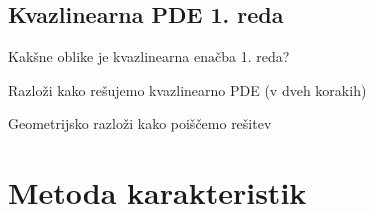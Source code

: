\documentclass{article}
\begin{document}
    \subsection{Kvazlinearna PDE 1. reda}
    \begin{enumerate}
        \item Kakšne oblike je kvazlinearna enačba 1. reda?
        {\color{red}\item Razloži kako rešujemo kvazlinearno PDE (v dveh korakih)}
        {\color{red}\item Geometrijsko razloži kako poiščemo rešitev}
    \end{enumerate}

    \section{Metoda karakteristik}
\end{document}
